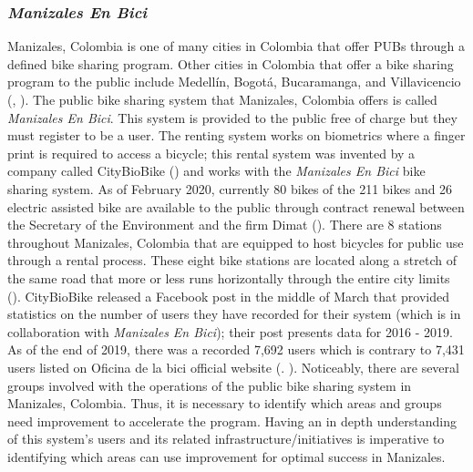 \documentclass[12pt]{article}
\begin{document}
\subsubsection*{\textit{Manizales En Bici}}
Manizales, Colombia is one of many cities in Colombia that offer PUBs through a defined bike sharing program. Other cities in Colombia that offer a bike sharing program to the public include Medellín, Bogotá, Bucaramanga, and Villavicencio (\cite{montoya2017acceso}, \cite{PublicOpinPBS}). The public bike sharing system that Manizales, Colombia offers is called \textit{Manizales En Bici}. This system is provided to the public free of charge but they must register to be a user. The renting system works on biometrics where a finger print is required to access a bicycle; this rental system was invented by a company called CityBioBike (\cite{CityBioBike}) and works with the \textit{Manizales En Bici} bike sharing system. As of February 2020, currently 80 bikes of the 211 bikes and 26 electric assisted bike are available to the public through contract renewal between the Secretary of the Environment and the firm Dimat (\cite{lapatria_2020}). There are 8 stations throughout Manizales, Colombia that are equipped to host bicycles for public use through a rental process. These eight bike stations are located along a stretch of the same road that more or less runs horizontally through the entire city limits (\cite{zuluaga_garcía_2017}). CityBioBike released a Facebook post in the middle of March that provided statistics on the number of users they have recorded for their system (which is in collaboration with \textit{Manizales En Bici}); their post presents data for 2016 - 2019. As of the end of 2019, there was a recorded 7,692 users which is contrary to 7,431 users listed on Oficina de la bici official website (\cite{CityBioBike}. \cite{OficinaDeLaBiciHome}). Noticeably, there are several groups involved with the operations of the public bike sharing system in Manizales, Colombia. Thus, it is necessary to identify which areas and groups need improvement to accelerate the program. Having an in depth understanding of this system's users and its related infrastructure/initiatives is imperative to identifying which areas can use improvement for optimal success in Manizales. 
\end{document}
